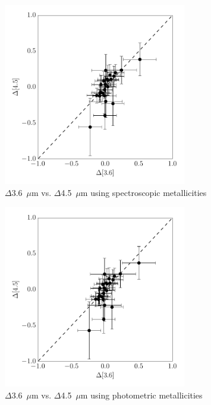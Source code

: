 \documentclass[a4paper,fleqn,usenatbib]{mnras}
\begin{document}
\begin{figure}
\begin{center}
\includegraphics[width=80mm]{final_plots/deltadelta_3p6_4p5_spect.pdf}
\caption{$\Delta$3.6~$\mu$m vs. $\Delta$4.5~$\mu$m using spectroscopic metallicities}
\label{fig:deltadelta_spect}
\end{center}
\end{figure}


\begin{figure}
\begin{center}
\includegraphics[width=80mm]{final_plots/deltadelta_3p6_4p5_phot.pdf}
\caption{$\Delta$3.6~$\mu$m vs. $\Delta$4.5~$\mu$m using photometric metallicities}
\label{fig:deltadelta_phot}
\end{center}
\end{figure}





\bsp	%
\label{lastpage}
\end{document}
